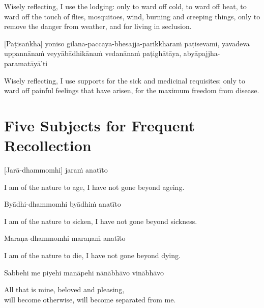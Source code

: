 \begin{english}
  Wisely reflecting, I use the lodging: only to ward off cold, to ward off heat,
  to ward off the touch of flies, mosquitoes, wind, burning and creeping things,
  only to remove the danger from weather, and for living in seclusion.
\end{english}

[Paṭisaṅkhā] yoniso gilāna-paccaya-bhesajja-parikkhāraṁ paṭisevāmi, yāvadeva
uppannānaṁ veyyābādhikānaṁ vedanānaṁ paṭighātāya, abyāpajjha-paramatāyā'ti

\begin{english}
  Wisely reflecting, I use supports for the sick and medicinal requisites: only
  to ward off painful feelings that have arisen, for the maximum freedom from
  disease.
\end{english}


\section{Five Subjects for Frequent Recollection}

\begin{leader}
\end{leader}



[Jarā-dhammomhi] jaraṁ anatīto

\begin{english}
  I am of the nature to age, I have not gone beyond ageing.
\end{english}

Byādhi-dhammomhi byādhiṁ anatīto

\begin{english}
  I am of the nature to sicken, I have not gone beyond sickness.
\end{english}

Maraṇa-dhammomhi maraṇaṁ anatīto

\begin{english}
  I am of the nature to die, I have not gone beyond dying.
\end{english}

Sabbehi me piyehi manāpehi nānābhāvo vinābhāvo

\begin{english}
  All that is mine, beloved and pleasing,\\
  will become otherwise, will become separated from me.
\end{english}

